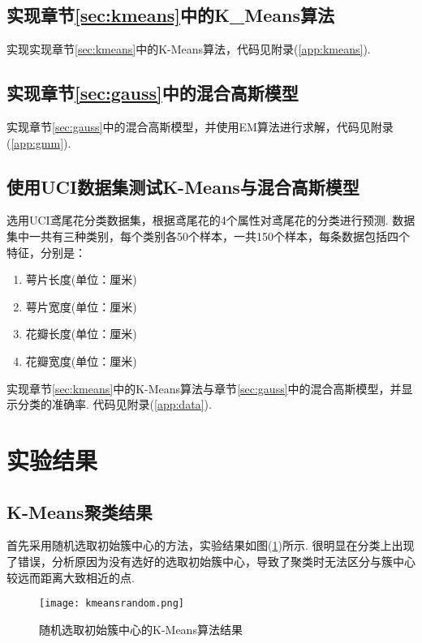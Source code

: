 \documentclass{hitreport}
\begin{document}
%

\subsection{实现章节\ref{sec:kmeans}中的K\_Means算法}

实现实现章节\ref{sec:kmeans}中的K-Means算法，代码见附录(\ref{app:kmeans}).

\subsection{实现章节\ref{sec:gauss}中的混合高斯模型}

实现章节\ref{sec:gauss}中的混合高斯模型，并使用EM算法进行求解，代码见附录(\ref{app:gmm}).

\subsection{使用UCI数据集测试K-Means与混合高斯模型}
选用UCI鸢尾花分类数据集，根据鸢尾花的4个属性对鸢尾花的分类进行预测. 数据集中一共有三种类别，每个类别各50个样本，一共150个样本，每条数据包括四个特征，分别是：
\begin{enumerate}
\item 萼片长度(单位：厘米)
\item 萼片宽度(单位：厘米)
\item 花瓣长度(单位：厘米)
\item 花瓣宽度(单位：厘米)
\end{enumerate}

实现章节\ref{sec:kmeans}中的K-Means算法与章节\ref{sec:gauss}中的混合高斯模型，并显示分类的准确率. 代码见附录(\ref{app:data}). 

\section{实验结果}

\subsection{K-Means聚类结果}

首先采用随机选取初始簇中心的方法，实验结果如图(\ref{fig:fig1})所示. 很明显在分类上出现了错误，分析原因为没有选好的选取初始簇中心，导致了聚类时无法区分与簇中心较远而距离大致相近的点.

\begin{figure}[htb]
	\centering
		\texttt{[image: kmeansrandom.png]}
	\caption{随机选取初始簇中心的K-Means算法结果}\label{fig:fig1}
\end{figure}
\end{document}
